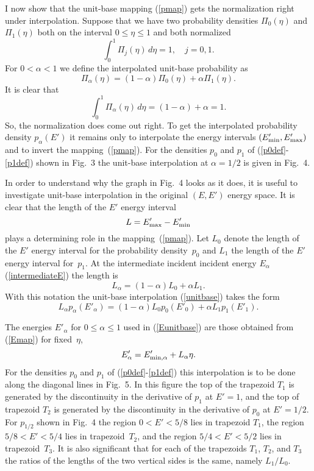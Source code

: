 \documentclass[11pt]{article}
\begin{document}
I now show that the unit-base mapping (\ref{pmap}) gets the
normalization right under interpolation.  Suppose that we
have two probability densities $\Pi_0(\eta)$ and $\Pi_1(\eta)$
both on the interval $0 \le \eta \le 1$ and both normalized
\[
  \int_0^1 \Pi_j(\eta) \, d\eta = 1, \quad j = 0, 1.
\]
For $0 < \alpha < 1$ we define the interpolated unit-base probability as
\begin{equation}
  \Pi_\alpha(\eta) = (1 - \alpha) \Pi_0(\eta) + \alpha \Pi_1(\eta).
  \label{unitbase}
\end{equation}
It is clear that
\[
  \int_0^1 \Pi_\alpha(\eta) \, d\eta = (1 - \alpha) + \alpha = 1.
\]
So, the normalization does come out right.  To get the interpolated
probability density $p_\alpha(E')$ it remains only to interpolate
the energy intervals $(E'_{\rm min}, E'_{\rm max})$ and to
invert the mapping~(\ref{pmap}).  For the densities $p_0$ and $p_1$
of (\ref{p0def}-\ref{p1def}) shown in Fig.~3 the unit-base
interpolation at $\alpha = 1/2$ is given in Fig.~4.

\begin{figure}

\end{figure}

In order to understand why the graph in Fig.~4 looks as it does,
it is useful to investigate unit-base interpolation in the
original $(E, E')$ energy space.  It is clear that the length
of the $E'$ energy interval
\[
  L = E'_{\rm max} - E'_{\rm min}
\]
plays a determining role in the mapping~(\ref{pmap}).  Let
$L_0$ denote the length of the $E'$ energy interval for
the probability density~$p_0$ and $L_1$ the length of 
the $E'$ energy interval for~$p_1$.  At the intermediate
incident incident energy $E_\alpha$ (\ref{intermediateE})
the length is
\[
   L_\alpha = (1 - \alpha)L_0 + \alpha L_1.
\]
With this notation the unit-base interpolation (\ref{unitbase})
takes the form
\begin{equation}
  L_\alpha p_\alpha( E'_\alpha ) =
    (1 - \alpha) L_0 p_0( E'_0 ) + \alpha L_1 p_1( E'_1 ).
  \label{Eunitbase}
\end{equation}

The energies $E'_\alpha$ for $0 \le \alpha \le 1$ used in
(\ref{Eunitbase}) are those
obtained from (\ref{Emap}) for fixed~$\eta$,
\[
  E'_\alpha = E'_{{\rm min},\alpha} + L_\alpha \eta.
\]
For the densities $p_0$ and $p_1$ of (\ref{p0def}-\ref{p1def})
this interpolation is to be done along the diagonal lines in
Fig.~5.  In this figure the top of the trapezoid $T_1$ is
generated by the discontinuity in the derivative of $p_1$ at $E' = 1$,
and the top of trapezoid $T_2$ is generated by the discontinuity in 
the derivative of $p_0$ at $E' = 1/2$.  For $p_{1/2}$ shown
in Fig.~4 the region $0 < E' < 5/8$ lies in trapezoid $T_1$, 
the region $5/8 < E' < 5/4$ lies in trapezoid~$T_2$, and
the region $5/4 < E' < 5/2$ lies in trapezoid~$T_3$.  It is also
significant that for each of the trapezoids $T_1$, $T_2$, and $T_3$
the ratios of the lengths of the two vertical sides is the same,
namely $L_1/L_0$.
\end{document}
